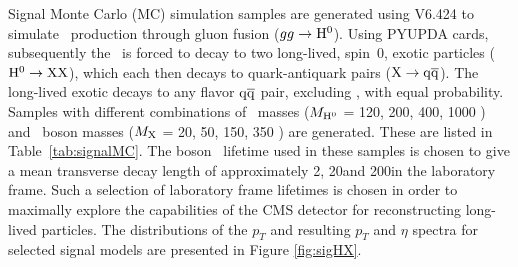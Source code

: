 Signal Monte Carlo (MC) simulation samples are generated using \PYTHIA V6.424 \cite{PYTHIA} to
simulate \Higgs~production through gluon fusion ($gg \rightarrow\mathrm{H}^{0}$). Using \PYTHIA PYUPDA cards,
subsequently the \Higgs~is forced to decay to two long-lived, spin~0, exotic particles
($\mathrm{H}^{0}\rightarrow\mathrm{X}\mathrm{X}$), which each then decays to quark-antiquark pairs ($\mathrm{X}\rightarrow\mathrm{q}\overline{\mathrm{q}}$).
The long-lived exotic \X decays to any flavor $\mathrm{q}\overline{\mathrm{q}}$ pair, excluding \ttbar, with equal probability. Samples
with different combinations of \Higgs~masses ($M_{\mathrm{H}^{0}}$ = 120, 200, 400, 1000 \GeVcc ) and \X~boson masses
($M_{\mathrm{X}}$ = 20, 50, 150, 350 \GeVcc) are generated. These are listed in Table~\ref{tab:signalMC}. The
\X boson ~lifetime used in these samples is chosen to give a mean transverse decay length of approximately
2\cm, 20\cm and 200\cm in the laboratory frame. Such a selection of laboratory frame lifetimes is chosen in 
order to maximally explore the capabilities of the CMS detector for reconstructing long-lived particles.
The distributions of the \Higgs $p_T$ and resulting \X $p_T$ and $\eta$ spectra for selected signal
models are presented in Figure \ref{fig:sigHX}.

